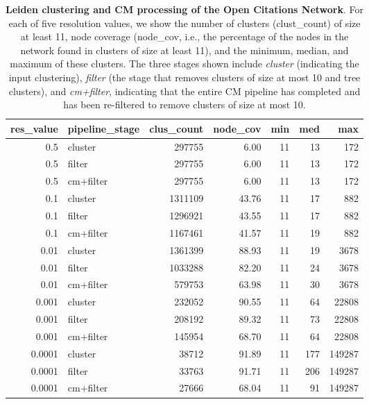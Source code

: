 \documentclass[11pt]{article}   	%
\begin{document}
\begin{table}[ht]
\centering
\begin{tabular}{rlrrrrr}
  \hline
res\_value & pipeline\_stage & clus\_count & node\_cov & min & med & max \\
  \hline
0.5 & cluster & 297755 & 6.00 &    11 & 13 &   172 \\
 0.5 & filter & 297755 & 6.00&    11 & 13 &   172 \\
 0.5 & cm+filter & 297755 & 6.00 &    11 & 13 &   172 \\
 \hline
 0.1 & cluster & 1311109 & 43.76 &    11 & 17 &   882 \\
 0.1 & filter & 1296921 & 43.55 &    11 & 17 &   882 \\
 0.1 & cm+filter & 1167461 & 41.57 &    11 & 19 &   882 \\
 \hline
 0.01 & cluster & 1361399 & 88.93 &    11 & 19 &  3678 \\
 0.01 & filter & 1033288 & 82.20 &    11 & 24 &  3678 \\
 0.01 & cm+filter & 579753 & 63.98 &    11 & 30 &  3678 \\
 \hline
 0.001 & cluster & 232052 & 90.55 &    11 & 64 & 22808 \\
 0.001 & filter & 208192 & 89.32 &    11 & 73 & 22808 \\
 0.001 & cm+filter & 145954 & 68.70 &    11 & 64 & 22808 \\
 \hline
 0.0001 & cluster & 38712 & 91.89 &    11 & 177 & 149287 \\
 0.0001 & filter & 33763 & 91.71 &    11 & 206 & 149287 \\
 0.0001 & cm+filter & 27666 & 68.04 &    11 & 91 & 149287 \\
   \hline
\end{tabular}
\caption{\textbf{Leiden clustering and CM processing of the Open Citations Network}. For each of five resolution values, we show  the number of clusters (clust\_count) of size at least 11, node coverage (node\_cov, i.e., the percentage  of the nodes in the network found in clusters of size at least 11), and the minimum, median, and maximum of these clusters. The three stages shown include  \emph{cluster} (indicating the input clustering), \emph{filter} (the stage that removes  clusters of size at most 10 and tree clusters), and  \emph{cm+filter}, indicating that the entire CM pipeline has completed and has been re-filtered to remove clusters of size at most 10.}
\label{tab:Leiden-OC-11}
\end{table}
\end{document}
